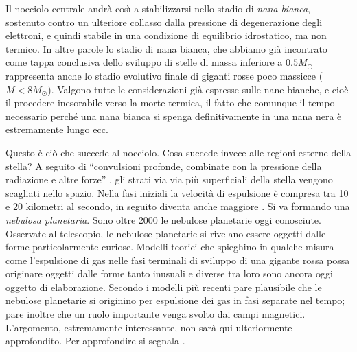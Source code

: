 Il nocciolo centrale andr\`{a} cos\`{\i}{} a stabilizzarsi nello stadio di \emph{nana bianca}, sostenuto contro un ulteriore collasso dalla pressione di degenerazione degli elettroni, e quindi stabile in una condizione di equilibrio idrostatico, ma non termico.
In altre parole lo stadio di nana bianca, che abbiamo gi\`{a} incontrato come tappa conclusiva dello sviluppo di stelle di massa inferiore a $0.5 M_{\odot}$ rappresenta anche lo stadio evolutivo finale di giganti rosse poco massicce ($M<8M_{\odot}$). Valgono tutte le considerazioni gi\`{a} espresse sulle nane bianche, e cioè il procedere inesorabile verso la morte termica, il fatto che comunque il tempo necessario perch\'{e} una nana bianca si spenga definitivamente in una nana nera è estremamente lungo ecc.
\par
Questo è ciò che succede al nocciolo. Cosa succede invece alle regioni esterne della stella?
A seguito di ``convulsioni profonde, combinate con la pressione della radiazione e altre forze'' \Cite{balick}, gli strati via via più superficiali della stella vengono scagliati nello spazio. Nella fasi iniziali la velocit\`{a} di espulsione è compresa tra 10 e 20 kilometri al secondo, in seguito diventa anche maggiore \Cite{balick}.
Si va formando una \emph{nebulosa planetaria}.
Sono oltre 2000 le nebulose planetarie oggi conosciute. Osservate al telescopio, le nebulose planetarie si rivelano essere oggetti dalle forme particolarmente curiose. Modelli teorici che spieghino in qualche misura come l'espulsione di gas nelle fasi terminali di sviluppo di una gigante rossa possa originare oggetti dalle forme tanto inusuali e diverse tra loro sono ancora oggi oggetto di elaborazione. Secondo i modelli più recenti pare plausibile che le nebulose planetarie si originino per espulsione dei gas in fasi separate nel tempo; pare inoltre che un ruolo importante venga svolto dai campi magnetici. L'argomento, estremamente interessante, non sar\`{a} qui ulteriormente approfondito. Per approfondire si segnala \Cite{balick}.
